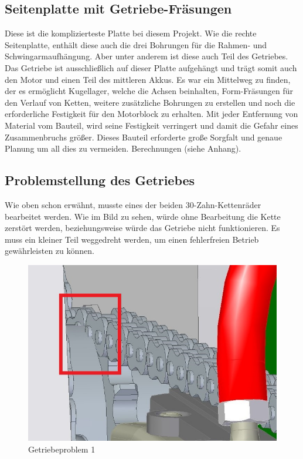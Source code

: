 \newpage

\subsection*{Seitenplatte mit Getriebe-Fräsungen}

Diese ist die komplizierteste Platte bei diesem Projekt. Wie die rechte Seitenplatte, enthält diese auch die drei Bohrungen für die Rahmen- und Schwingarmaufhängung. Aber unter anderem ist diese auch Teil des Getriebes. Das Getriebe ist ausschließlich auf dieser Platte aufgehängt und trägt somit auch den Motor und einen Teil des mittleren Akkus. 
Es war ein Mittelweg zu finden, der es ermöglicht Kugellager, welche die Achsen beinhalten, Form-Fräsungen für den Verlauf von Ketten, weitere zusätzliche Bohrungen zu erstellen und noch die erforderliche Festigkeit für den Motorblock zu erhalten. Mit jeder Entfernung von Material vom Bauteil, wird seine Festigkeit verringert und damit die Gefahr eines Zusammenbruchs größer.
Dieses Bauteil erforderte große Sorgfalt und genaue Planung um all dies zu vermeiden.
Berechnungen (siehe Anhang).   


\subsection*{Problemstellung des Getriebes}

Wie oben schon erwähnt, musste eines der beiden 30-Zahn-Kettenräder bearbeitet werden. Wie im Bild zu sehen, würde ohne Bearbeitung die Kette zerstört werden, beziehungsweise würde das Getriebe nicht funktionieren. Es muss ein kleiner Teil weggedreht werden, um einen fehlerfreien Betrieb gewährleisten zu können.


\begin{figure} [H]
	\begin{center}
		\includegraphics[scale=0.5]{figures/mechanik/Getriebeproblem2.jpg}
			\caption{Getriebeproblem 1}
			\label{fig:Getriebeproblem 1}
	\end{center}
\end{figure}

